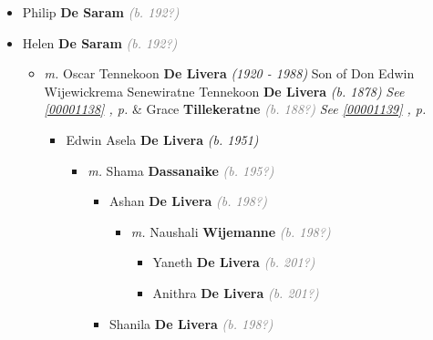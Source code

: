 \documentclass[10pt, openany]{book}
\begin{document}
\begin{itemize}
{\begin{itemize}
{\begin{itemize}
{\begin{itemize}
{\begin{itemize}
{\begin{itemize}
{\begin{itemize}
{\begin{itemize}
\item{Hazel \textbf{De Livera} \textcolor{gray}{\textit{(b. 195?)}}
  }
\end{itemize}}
\end{itemize}
   }
\item{Philip \textbf{De Saram} \textcolor{gray}{\textit{(b. 192?)}}
  }
\item{Helen \textbf{De Saram} \textcolor{gray}{\textit{(b. 192?)}}
\begin{itemize}
\item{\textit{m.} Oscar Tennekoon \textbf{De Livera} \textcolor{slorange}{\textit{(1920 - 1988)}} Son of  Don Edwin Wijewickrema Senewiratne Tennekoon \textbf{De Livera} \textcolor{slorange}{\textit{(b. 1878)}} \textcolor{slteal}{\textit{See  \autoref{00001138} \textit{, p. \pageref{00001138} }}}  \&  Grace \textbf{Tillekeratne} \textcolor{gray}{\textit{(b. 188?)}} \textcolor{slteal}{\textit{See  \autoref{00001139} \textit{, p. \pageref{00001139} }}}   \label{couple:00001146:00001147} \begin{itemize}
\item{Edwin Asela \textbf{De Livera} \textcolor{slorange}{\textit{(b. 1951)}}
\begin{itemize}
\item{\textit{m.} Shama \textbf{Dassanaike} \textcolor{gray}{\textit{(b. 195?)}}   \label{couple:00001149:00001150} \begin{itemize}
\item{Ashan \textbf{De Livera} \textcolor{gray}{\textit{(b. 198?)}}
\begin{itemize}
\item{\textit{m.} Naushali \textbf{Wijemanne} \textcolor{gray}{\textit{(b. 198?)}}   \label{couple:00001151:00001152} \begin{itemize}
\item{Yaneth \textbf{De Livera} \textcolor{gray}{\textit{(b. 201?)}}
  }
\item{Anithra \textbf{De Livera} \textcolor{gray}{\textit{(b. 201?)}}
  }
\end{itemize}}
\end{itemize}
  }
\item{Shanila \textbf{De Livera} \textcolor{gray}{\textit{(b. 198?)}}
  }
\end{itemize}}

\end{itemize}}
\end{itemize}}
\end{itemize}}
\end{itemize}}
\end{itemize}}
\end{itemize}}
\end{itemize}}
\end{itemize}}
\end{itemize}
\end{document}
